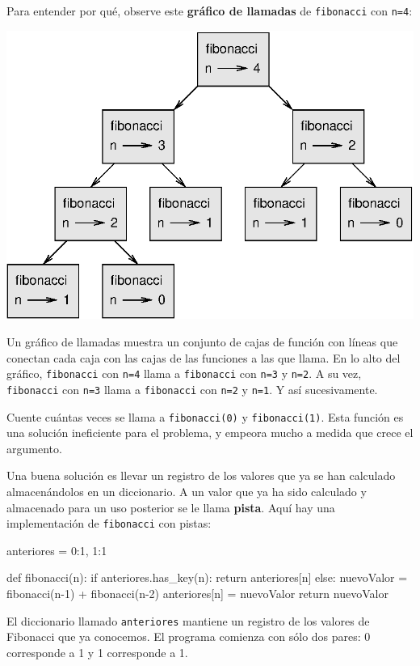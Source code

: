 Para entender por qué, observe este \textbf{gráfico de llamadas} de
\texttt{fibonacci} con \texttt{n=4}:

\beforefig \centerline{\includegraphics{illustrations/fibonacci}}
\afterfig

Un gráfico de llamadas muestra un conjunto de cajas de función con
líneas que conectan cada caja con las cajas de las funciones a las
que llama. En lo alto del gráfico, \texttt{fibonacci} con \texttt{n=4}
llama a \texttt{fibonacci} con \texttt{n=3} y \texttt{n=2}. A su vez,
\texttt{fibonacci} con \texttt{n=3} llama a \texttt{fibonacci} con
\texttt{n=2} y \texttt{n=1}. Y así sucesivamente.

  

Cuente cuántas veces se llama a \texttt{fibonacci(0)} y \texttt{fibonacci(1)}.
Esta función es una solución ineficiente para el problema, y empeora
mucho a medida que crece el argumento.

Una buena solución es llevar un registro de los valores que ya se
han calculado almacenándolos en un diccionario. A un valor que ya
ha sido calculado y almacenado para un uso posterior se le llama \textbf{pista}.
Aquí hay una implementación de \texttt{fibonacci} con pistas:
\begin{pythoncode}
anteriores = {0:1, 1:1}

def fibonacci(n):
  if anteriores.has_key(n):
    return anteriores[n]
  else:
    nuevoValor = fibonacci(n-1) + fibonacci(n-2)
    anteriores[n] = nuevoValor
    return nuevoValor
\end{pythoncode}

El diccionario llamado \texttt{anteriores} mantiene un registro de
los valores de Fibonacci que ya conocemos. El programa comienza con
sólo dos pares: 0 corresponde a 1 y 1 corresponde a 1.


